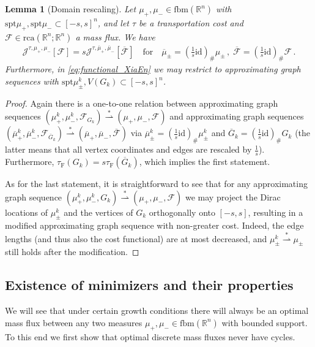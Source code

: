 \documentclass[10pt,a4paper,oneside,final]{article}
\newcommand{\R}{{\mathbb{R}}}
\newcommand{\id}{\mathrm{id}}
\newcommand{\rca}{\mathrm{rca}}
\newcommand{\fbm}{{\mathrm{fbm}}}
\newcommand{\pushforward}[2]{{{#1}_{\#}#2}}
\newcommand{\spt}{{\mathrm{spt}}}
\newcommand{\weakstarto}{\stackrel{*}{\rightharpoonup}}
\newcommand{\flux}{{\mathcal{F}}}
\newcommand{\JEn}{{\mathcal{J}}}
\newcommand{\JEnXia}[1][\tau]{#1_{\mathrm{F}}}%
\newcommand{\transportPath}{mass flux}
\newcommand{\transportPaths}{mass fluxes}
\numberwithin{equation}{section}
\theoremstyle{plain}
\newtheorem{lemma}[theorem]{Lemma}
\theoremstyle{definition}
\theoremstyle{remark}
\begin{document}
\begin{lemma}[Domain rescaling]\label{thm:domainRescaling}
Let $\mu_+,\mu_-\in\fbm(\R^n)$ with $\spt\mu_+,\spt\mu_-\subset[-s,s]^n$, and let $\tau$ be a transportation cost and $\flux\in\rca(\R^n;\R^n)$ a \transportPath{}.
We have
\begin{gather*}
\JEn^{\tau,\mu_+,\mu_-}[\flux]=s\JEn^{\tau,\overline\mu_+,\overline\mu_-}[\overline\flux]\quad\text{for}\quad
\overline\mu_\pm=\pushforward{(\tfrac1s\id)}{\mu_\pm}\,,\;
\overline\flux=\pushforward{(\tfrac1s\id)}{\flux}\,.
\end{gather*}
Furthermore, in \eqref{eq:functional_XiaEn} we may restrict to approximating graph sequences with $\spt\mu_\pm^k,V(G_k)\subset[-s,s]^n$.
\end{lemma}
\begin{proof}
Again there is a one-to-one relation between approximating graph sequences $(\mu_+^k,\mu_-^k,\flux_{G_k})\weakstarto(\mu_+,\mu_-,\flux)$
and approximating graph sequences $(\overline\mu_+^k,\overline\mu_-^k,\flux_{\overline G_k})\weakstarto(\overline\mu_+,\overline\mu_-,\overline\flux)$
via $\overline\mu_\pm^k=\pushforward{(\tfrac1s\id)}{\mu_\pm^k}$ and $\overline G_k=\pushforward{(\tfrac1s\id)}{G_k}$ (the latter means that all vertex coordinates and edges are rescaled by $\frac1s$).
Furthermore, $\JEnXia(G_k)=s\JEnXia(\overline G_k)$, which implies the first statement.

As for the last statement, it is straightforward to see that for any approximating graph sequence $(\mu_+^k,\mu_-^k,G_k)\weakstarto(\mu_+,\mu_-,\flux)$
we may project the Dirac locations of $\mu_\pm^k$ and the vertices of $G_k$ orthogonally onto $[-s,s]$, resulting in a modified approximating graph sequence with non-greater cost.
Indeed, the edge lengths (and thus also the cost functional) are at most decreased, and $\mu_\pm^k\weakstarto\mu_\pm$ still holds after the modification.
\end{proof}


\subsection{Existence of minimizers and their properties}

We will see that under certain growth conditions there will always be an optimal \transportPath{} between any two measures $\mu_+,\mu_-\in\fbm(\R^n)$ with bounded support.
To this end we first show that optimal discrete \transportPaths{} never have cycles.
\end{document}
